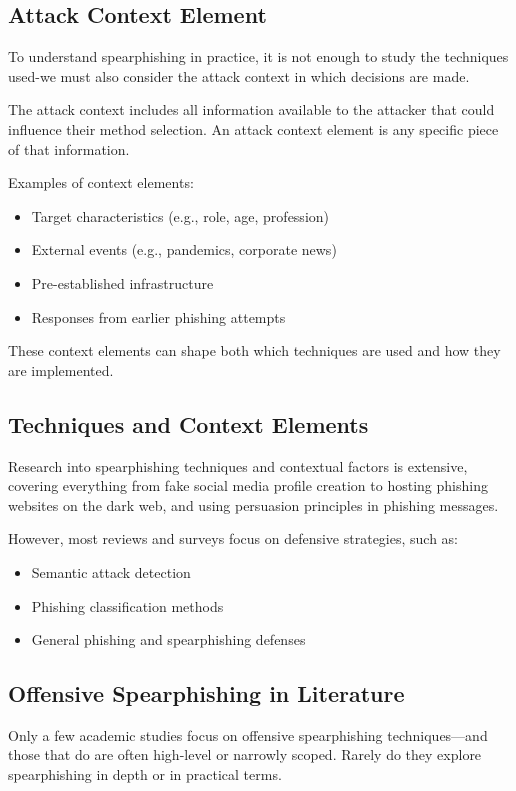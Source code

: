 \subsection{Attack Context Element}
To understand spearphishing in practice, it is not enough to study the techniques used-we must also consider the attack context in which decisions are made.

The attack context includes all information available to the attacker that could influence their method selection. An attack context element is any specific piece of that information.

Examples of context elements:
\begin{itemize}
    \item Target characteristics (e.g., role, age, profession)
    \item External events (e.g., pandemics, corporate news)
    \item Pre-established infrastructure
    \item Responses from earlier phishing attempts
\end{itemize}

These context elements can shape both which techniques are used and how they are implemented.

\subsection{Techniques and Context Elements}
Research into spearphishing techniques and contextual factors is extensive, covering everything from fake social media profile creation to hosting phishing websites on the dark web, and using persuasion principles in phishing messages.

However, most reviews and surveys focus on defensive strategies, such as:

\begin{itemize}
    \item Semantic attack detection
    \item Phishing classification methods
    \item General phishing and spearphishing defenses
\end{itemize}

\subsection{Offensive Spearphishing in Literature}
Only a few academic studies focus on offensive spearphishing techniques—and those that do are often high-level or narrowly scoped. Rarely do they explore spearphishing in depth or in practical terms.

